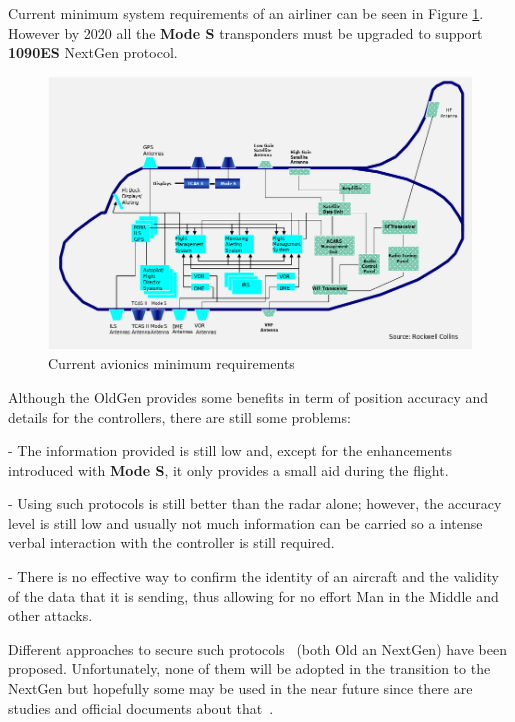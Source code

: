 \documentclass[../main.tex]{subfiles}
\begin{document}
Current minimum system requirements of an airliner can be seen in Figure \ref{fig:modern}. However by 2020 all the \textbf{Mode S} transponders must be upgraded to support \textbf{1090ES} NextGen protocol.

\begin{figure}[htp]
  \centering
  \includegraphics[scale=0.63]{images/current_avionics.png}
  \caption{Current avionics minimum requirements}
  \label{fig:modern}
\end{figure}

Although the OldGen provides some benefits in term of position accuracy and details for the controllers, there are still some problems:

- The information provided is still low and, except for the enhancements introduced with \textbf{Mode S}, it only provides a small aid during the flight.

- Using such protocols is still better than the radar alone; however, the accuracy level is still low and usually not much information can be carried so a intense verbal interaction with the controller is still required.

- There is no effective way to confirm the identity of an aircraft and the validity of the data that it is sending, thus allowing for no effort Man in the Middle and other attacks.

Different approaches to secure such protocols~\cite{nextgenenc} (both Old an NextGen) have been proposed. Unfortunately, none of them will be adopted in the transition to the NextGen but hopefully some may be used in the near future since there are studies and official documents about that~\cite{adsbimp}.

\bigskip
\end{document}
